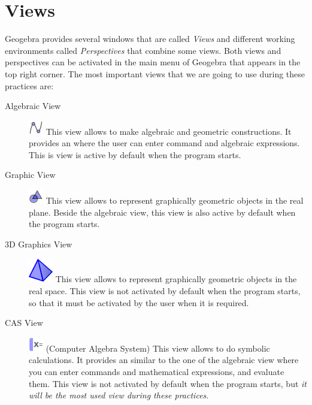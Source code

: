 \section{Views}
Geogebra provides several windows that are called \emph{Views} and different working environments called \emph{Perspectives} that combine some views.
Both views and perspectives can be activated in the main menu of Geogebra that appears in the top right corner.
The most important views that we are going to use during these practices are:
\begin{description}
\item[Algebraic View] \includegraphics[scale=0.03]{img/introduction/algebraic-view-icon} This view allows to make algebraic and geometric constructions.
      It provides an  where the user can enter command and algebraic expressions.
      This is view is active by default when the program starts.
\item[Graphic View] \includegraphics[scale=0.03]{img/introduction/graphics-view-icon}
      This view allows to represent graphically geometric objects in the real plane.
      Beside the algebraic view, this view is also active by default when the program starts.
\item[3D Graphics View] \includegraphics[scale=0.3]{img/introduction/3d-graphics-view-icon} This view allows to represent graphically geometric objects in the real space.
      This view is not activated by default when the program starts, so that it must be activated by the user when it is required.
\item[CAS View] \includegraphics[scale=0.03]{img/introduction/cas-view-icon} (Computer Algebra System) This view allows to do symbolic calculations.
      It provides an  similar to the one of the algebraic view where you can enter commands and mathematical expressions, and evaluate them.
      This view is not activated by default when the program starts, but \emph{it will be the most used view during these practices}.
\end{description}


